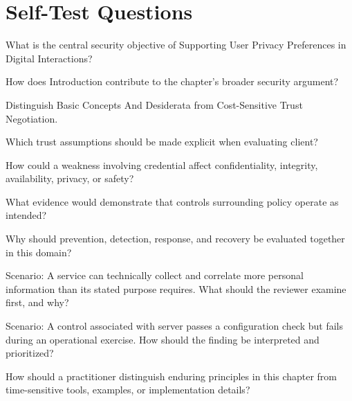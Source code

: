 \documentclass[11pt,letterpaper]{article}
\begin{document}
\section*{Self-Test Questions}
\begin{CornellRecallList}
\item What is the central security objective of Supporting User Privacy Preferences in Digital Interactions?
\item How does Introduction contribute to the chapter's broader security argument?
\item Distinguish Basic Concepts And Desiderata from Cost-Sensitive Trust Negotiation.
\item Which trust assumptions should be made explicit when evaluating client?
\item How could a weakness involving credential affect confidentiality, integrity, availability, privacy, or safety?
\item What evidence would demonstrate that controls surrounding policy operate as intended?
\item Why should prevention, detection, response, and recovery be evaluated together in this domain?
\item Scenario: A service can technically collect and correlate more personal information than its stated purpose requires. What should the reviewer examine first, and why?
\item Scenario: A control associated with server passes a configuration check but fails during an operational exercise. How should the finding be interpreted and prioritized?
\item How should a practitioner distinguish enduring principles in this chapter from time-sensitive tools, examples, or implementation details?
\end{CornellRecallList}
\end{document}

